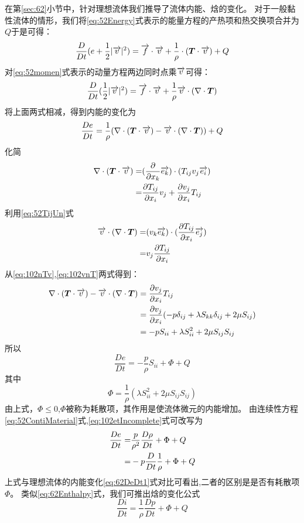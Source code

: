 在第\ref{sec:62}小节中，针对理想流体我们推导了流体内能、焓的变化。
对于一般黏性流体的情形，我们将\eqref{eq:52Energy}式表示的能量方程的产热项和热交换项合并为$Q$于是可得：
\begin{equation}
\frac{D}{Dt}(e+\frac{1}{2}|\overrightarrow{v}|^2)=\overrightarrow{f}\cdot\overrightarrow{v}+\frac{1}{\rho}\cdot (\bm{T}\cdot\overrightarrow{v})+Q
\end{equation}
对\eqref{eq:52momen}式表示的动量方程两边同时点乘$\overrightarrow{v}$可得：
\begin{equation}
\frac{D}{Dt}(\frac{1}{2}|\overrightarrow{v}|^2)=\overrightarrow{f}\cdot\overrightarrow{v}+\frac{1}{\rho}\overrightarrow{v}\cdot(\nabla \cdot \bm{T})
\end{equation}
将上面两式相减，得到内能的变化为
\begin{equation}
\frac{D e}{Dt}=\frac{1}{\rho}(\nabla\cdot (\bm{T}\cdot\overrightarrow{v})-\overrightarrow{v}\cdot(\nabla \cdot \bm{T}))+Q
\end{equation}
化简
\begin{align}\notag
\nabla\cdot (\bm{T}\cdot\overrightarrow{v}) = & (\frac{\partial}{\partial x_k}\overrightarrow{e_k})\cdot (T_{ij}v_j\overrightarrow{e_i})\\
= & \frac{\partial T_{ij}}{\partial x_i} v_j + \frac{\partial v_j}{\partial x_i} T_{ij}\label{eq:102nTv}
\end{align}
利用\eqref{eq:52TijUn}式
\begin{align}\notag
\overrightarrow{v}\cdot(\nabla \cdot \bm{T}) =& (v_k \overrightarrow{e_k}) \cdot (\frac{\partial T_{ij}}{\partial x_i}\overrightarrow{e_j})\\
=& v_j \frac{\partial T_{ij}}{\partial x_i}\label{eq:102vnT}
\end{align}
从\eqref{eq:102nTv},\eqref{eq:102vnT}两式得到：
\begin{align*}
\nabla\cdot (\bm{T}\cdot\overrightarrow{v})-\overrightarrow{v}\cdot(\nabla \cdot \bm{T}) & = \frac{\partial v_j}{\partial x_i} T_{ij} \\
& = \frac{\partial v_j}{\partial x_i} (-p\delta_{ij}+\lambda S_{kk} \delta_{ij} +2\mu S_{ij}) \\
& = -p S_{ii} +\lambda S_{ii}^2 + 2\mu S_{ij}S_{ij}
\end{align*}
所以
\begin{equation}\label{eq:102etIncomplete}
\frac{D e}{Dt}= -\frac{p}{\rho} S_{ii} + \Phi + Q
\end{equation}
其中
\begin{equation}
\Phi=\frac{1}{\rho}(\lambda S_{ii}^2 + 2\mu S_{ij}S_{ij})
\end{equation}
由上式，$\Phi\leq 0$,$\Phi$被称为耗散项，其作用是使流体微元的内能增加。
由连续性方程\eqref{eq:52ContiMaterial}式,\eqref{eq:102etIncomplete}式可改写为
\begin{align}\notag
\frac{D e}{Dt} =& \frac{p}{\rho^2} \frac{D\rho}{Dt} + \Phi + Q\\
= & -p  \frac{D}{Dt}\frac{1}{\rho} + \Phi + Q
\end{align}
上式与理想流体的内能变化\eqref{eq:62DeDt1}式对比可看出,二者的区别是是否有耗散项$\Phi$。
类似\eqref{eq:62Enthalpy}式，我们可推出焓的变化公式
\begin{equation}
\frac{D i}{D t} = \frac{1}{\rho} \frac{D p }{D t}+ \Phi + Q
\end{equation}

